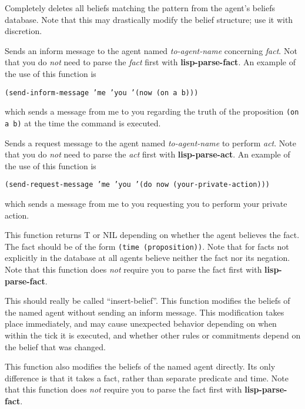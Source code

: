 Completely deletes all beliefs matching the pattern from the agent's
beliefs database.  Note that this may drastically modify the belief
structure; use it with discretion.

Sends an inform message to the agent named {\em to-agent-name\/}
concerning {\em fact\/}.  Not that you do {\em not\/} need to parse
the {\em fact\/} first with {\bf lisp-parse-fact}.  An example of the
use of this function is
\begin{center}
{\tt (send-inform-message 'me 'you '(now (on a b)))}
\end{center}
which sends a message from me to you regarding the truth of the
proposition {\tt (on a b)} at the time the command is executed.

Sends a request message to the agent named {\em to-agent-name\/} to
perform {\em act\/}.  Note that you do {\em not\/} need to parse the
{\em act\/} first with {\bf lisp-parse-act}.  An example of the use of
this function is
\begin{center}
{\tt (send-request-message 'me 'you '(do now (your-private-action)))}
\end{center}
which sends a message from me to you requesting you to perform your
private action.

This function returns T or NIL depending on whether the agent believes
the fact.  The fact should be of the form {\tt (time (proposition))}.
Note that for facts not explicitly in the database at all agents
believe neither the fact nor its negation.  Note that this function
does {\em not\/} require you to parse the fact first with {\bf
lisp-parse-fact}.

This should really be called ``insert-belief''.  This function
modifies the beliefs of the named agent without sending an inform
message.  This modification takes place immediately, and may cause
unexpected behavior depending on when within the tick it is executed,
and whether other rules or commitments depend on the belief that was
changed.  

This function also modifies the beliefs of the named agent directly.
Its only difference is that it takes a fact, rather than separate
predicate and time.  Note that this function does {\em not\/} require
you to parse the fact first with {\bf lisp-parse-fact}.

